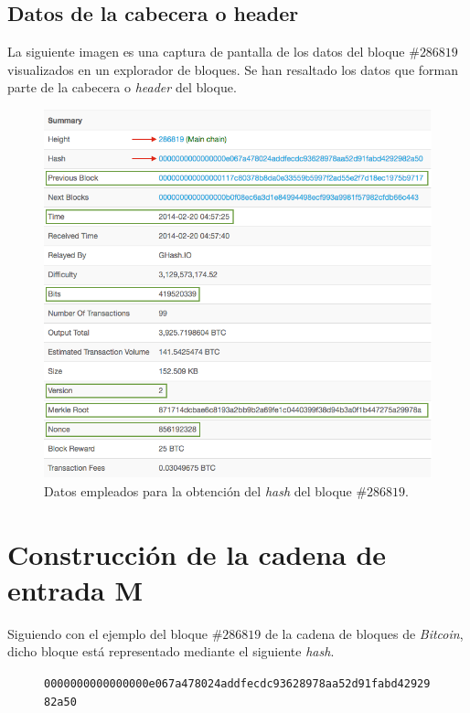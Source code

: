 \documentclass{article}
\begin{document}
    \subsection{Datos de la cabecera o header}
    La siguiente imagen es una captura de pantalla de los datos del bloque $\#286819$ visualizados en un explorador de bloques. Se han resaltado los datos que forman parte de la cabecera o \textit{header} del bloque.
    \begin{figure}[H]
    \centering
        \includegraphics[scale=0.39]{img/Bitcoin_block_SHA_256_Block_Data}
        \caption{Datos empleados para la obtención del \textit{hash} del bloque \#$286819$.}
    \end{figure}
    
    \vspace{3mm}
    
\section{Construcción de la cadena de entrada M}
    Siguiendo con el ejemplo del bloque $\#286819$ de la cadena de bloques de \textit{Bitcoin}, dicho bloque está representado mediante el siguiente \textit{hash}.
    
    \begin{figure}[H]
        \centering
        \scriptsize{
        \texttt{0000000000000000e067a478024addfecdc93628978aa52d91fabd4292982a50}
        }
    \end{figure}
    
\end{document}
